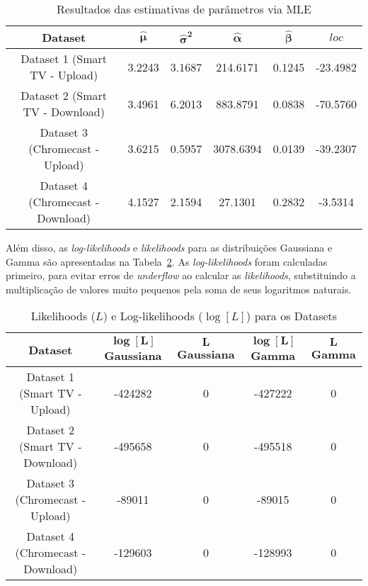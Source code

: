 \begin{table}[H]
    \centering
    \caption{Resultados das estimativas de parâmetros via MLE}
    \label{tab:resultados_mle}
    \begin{tabular}{|c|c|c|c|c|c|}
        \hline
        \textbf{Dataset} & $\boldsymbol{\hat{\mu}}$ & $\boldsymbol{\hat{\sigma}^2}$ & $\boldsymbol{\hat{\alpha}}$ & $\boldsymbol{\hat{\beta}}$ & $\boldsymbol{\textit{loc}}$ \\ 
        \hline
        Dataset 1 (Smart TV - Upload) & 3.2243 & 3.1687 & 214.6171 & 0.1245 & -23.4982 \\ 
        \hline
        Dataset 2 (Smart TV - Download) & 3.4961 & 6.2013 & 883.8791 & 0.0838 & -70.5760 \\ 
        \hline
        Dataset 3 (Chromecast - Upload) & 3.6215 & 0.5957 & 3078.6394 & 0.0139 & -39.2307 \\ 
        \hline
        Dataset 4 (Chromecast - Download) & 4.1527 & 2.1594 & 27.1301 & 0.2832 & -3.5314 \\ 
        \hline
        \end{tabular}
    \end{table}

    Além disso, as \textit{log-likelihoods} e \textit{likelihoods} para as distribuições Gaussiana e Gamma são apresentadas na Tabela~\ref{tab:likelihoods}. As \textit{log-likelihoods} foram calculadas primeiro, para evitar erros de \textit{underflow} ao calcular as \textit{likelihoods}, substituindo a multiplicação de valores muito pequenos pela soma de seus logaritmos naturais.
    \begin{table}[H]
        \centering
        \caption{Likelihoods ($L$) e Log-likelihoods ($\log[L]$) para os Datasets}
        \label{tab:likelihoods}
        \begin{adjustbox}{center}
        \begin{tabular}{|c|c|c|c|c|}
        \hline
        \textbf{Dataset} & $\boldsymbol{\log[L]}$ \textbf{Gaussiana} & $\boldsymbol{L}$ \textbf{Gaussiana} & $\boldsymbol{\log[L]}$ \textbf{Gamma} & $\boldsymbol{L}$ \textbf{Gamma} \\ 
        \hline
        Dataset 1 (Smart TV - Upload) & -424282 & 0 & -427222 & 0 \\ 
        \hline
        Dataset 2 (Smart TV - Download) & -495658 & 0 & -495518 & 0 \\ 
        \hline
        Dataset 3 (Chromecast - Upload) & -89011 & 0 & -89015 & 0 \\ 
        \hline
        Dataset 4 (Chromecast - Download) & -129603 & 0 & -128993 & 0 \\ 
        \hline
        \end{tabular}
        \end{adjustbox}
    \end{table}

